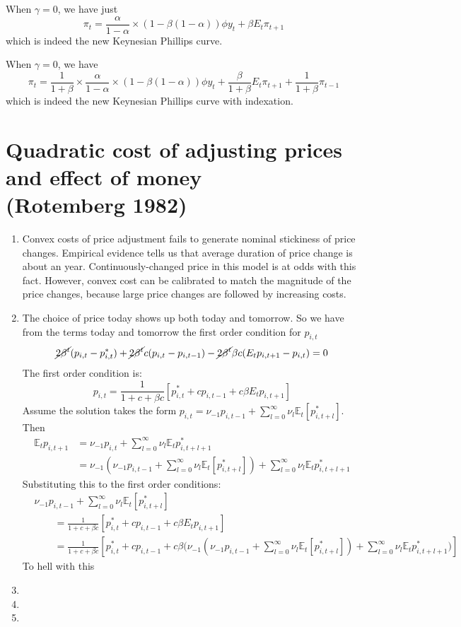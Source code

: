 \documentclass[11pt]{amsart}
\begin{document}
When $\gamma = 0$, we have just
\[
\pi_t =  \frac{\alpha}{1-\alpha} \times (1 - \beta (1-\alpha)) \phi  y_t +  \beta E_t \pi_{t+1} 
\]
which is indeed the new Keynesian Phillips curve.

When $\gamma = 0$, we have 
\[
\pi_t = \frac{1}{1 + \beta}  \times \frac{\alpha}{1-\alpha} \times (1 - \beta (1-\alpha)) \phi y_t + \frac{\beta}{1 + \beta}E_t \pi_{t+1} +  \frac{1}{1 + \beta} \pi_{t-1}
\]
which is indeed the new Keynesian Phillips curve with indexation.

\section{Quadratic cost of adjusting prices and effect of money \\ (Rotemberg 1982)}
\begin{enumerate}[label = (\alph*)]
	\item Convex costs of price adjustment fails to generate nominal stickiness of price changes. 
	Empirical evidence tells us that average duration of price change is about an year. 
	Continuously-changed price in this model is at odds with this fact. 
	However, convex cost can be calibrated to match the magnitude of the price changes, because large price changes are followed by increasing costs. 
	\item 
	The choice of price today shows up both today and tomorrow. 
	So we have from the terms today and tomorrow the first order condition for $p_{i,t}$
	\[
	\cancel{2 \beta^t} (p_{i,t} - p_{i,t}^*) + \cancel{2 \beta^t} c (p_{i,t} - p_{i,t-1}) - \cancel{2 \beta^t} \beta c (E_t p_{i,t+1} - p_{i,t}) = 0
	\]
	The first order condition is: 
	\begin{equation*}
    p_{i,t} = \frac{1}{1 + c + \beta c} \left[ p_{i,t}^{*} + c p_{i,t-1} + c \beta E_t p_{i,t+1} \right]
	\end{equation*}
	Assume the solution takes the form $p_{i,t} = \nu_{-1} p_{i,t-1} + \sum_{l=0}^{\infty}\nu_l \mathbb{E}_t [p_{i,t+l}^{*}]$. Then
	\begin{align*}
	\mathbb{E}_t p_{i,t+1} &= \nu_{-1} p_{i,t} + \sum_{l=0}^{\infty} \nu_l \mathbb{E}_t p_{i,t+l+1}^{*} \\
	& = \nu_{-1} \left( \nu_{-1} p_{i,t-1} + \sum_{l=0}^{\infty}\nu_l \mathbb{E}_t [p_{i,t+l}^{*}] \right)+ \sum_{l=0}^{\infty} \nu_l \mathbb{E}_t p_{i,t+l+1}^{*}
	\end{align*}  Substituting this to the first order conditions: 
	\begin{align*}
	 &\nu_{-1} p_{i,t-1} + \sum_{l=0}^{\infty}\nu_l \mathbb{E}_t [p_{i,t+l}^{*}] \\
	 &\qquad  = \frac{1}{1 + c + \beta c} \left[ p_{i,t}^{*} + c p_{i,t-1} + c \beta E_t p_{i,t+1} \right] \\
	&\qquad  = \frac{1}{1 + c + \beta c} \left[ p_{i,t}^{*} + c p_{i,t-1} + c \beta \Bigg( \nu_{-1} \left( \nu_{-1} p_{i,t-1} + \sum_{l=0}^{\infty}\nu_l \mathbb{E}_t [p_{i,t+l}^{*}] \right)+ \sum_{l=0}^{\infty} \nu_l \mathbb{E}_t p_{i,t+l+1}^{*}  \Bigg) \right]
	\end{align*}
	To hell with this
	\item 
	\item 
	\item
\end{enumerate}
\end{document}

